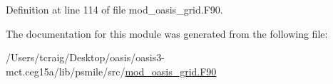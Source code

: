 Definition at line 114 of file mod\+\_\+oasis\+\_\+grid.\+F90.



The documentation for this module was generated from the following file\+:\begin{DoxyCompactItemize}
\item 
/\+Users/tcraig/\+Desktop/oasis/oasis3-\/mct.\+ceg15a/lib/psmile/src/\hyperlink{mod__oasis__grid_8_f90}{mod\+\_\+oasis\+\_\+grid.\+F90}\end{DoxyCompactItemize}
